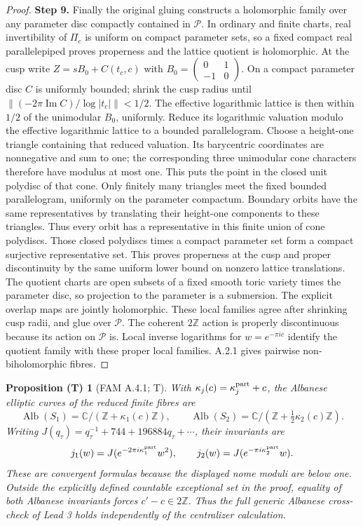 \documentclass[11pt,a4paper]{article}
\theoremstyle{plain}
\newtheorem{proposition}[theorem]{Proposition (T)}
\theoremstyle{definition}
\begin{document}
\begin{proof}
\par\smallskip\noindent\textbf{Step 9.} Finally the original gluing constructs a holomorphic family over any parameter disc compactly contained in $\mathcal P$. In ordinary and finite charts, real invertibility of $\Pi_c$ is uniform on compact parameter sets, so a fixed compact real parallelepiped proves properness and the lattice quotient is holomorphic. At the cusp write $Z=sB_0+C(t_c,c)$ with $B_0=\left(\begin{smallmatrix}0&1\\-1&0\end{smallmatrix}\right)$. On a compact parameter disc $C$ is uniformly bounded; shrink the cusp radius until
$\|(-2\pi\operatorname{Im}C)/\log|t_c|\|<1/2$. The effective logarithmic lattice is then within $1/2$ of the unimodular $B_0$, uniformly. Reduce its logarithmic valuation modulo the effective logarithmic lattice to a bounded parallelogram. Choose a height-one triangle containing that reduced valuation. Its barycentric coordinates are nonnegative and sum to one; the corresponding three unimodular cone characters therefore have modulus at most one. This puts the point in the closed unit polydisc of that cone. Only finitely many triangles meet the fixed bounded parallelogram, uniformly on the parameter compactum. Boundary orbits have the same representatives by translating their height-one components to these triangles. Thus every orbit has a representative in this finite union of cone polydiscs. Those closed polydiscs times a compact parameter set form a compact surjective representative set. This proves properness at the cusp and proper discontinuity by the same uniform lower bound on nonzero lattice translations. The quotient charts are open subsets of a fixed smooth toric variety times the parameter disc, so projection to the parameter is a submersion. The explicit overlap maps are jointly holomorphic. These local families agree after shrinking cusp radii, and glue over $\mathcal P$. The coherent $2\mathbb Z$ action is properly discontinuous because its action on $\mathcal P$ is. Local inverse logarithms for $w=e^{-\pi ic}$ identify the quotient family with these proper local families. A.2.1 gives pairwise non-biholomorphic fibres.
\end{proof}
\begin{proposition}[FAM A.4.1; T]\label{fam:A.4.1}
With $\kappa_j(c)=\kappa_j^{\rm part}+c$, the Albanese elliptic curves of the reduced finite fibres are
\[
 \operatorname{Alb}(S_1)=\mathbb C/(\mathbb Z+\kappa_1(c)\mathbb Z),\qquad
 \operatorname{Alb}(S_2)=\mathbb C/(\mathbb Z+\tfrac12\kappa_2(c)\mathbb Z).
\]
Writing $J(q_\tau)=q_\tau^{-1}+744+196884q_\tau+\cdots$, their invariants are
\[
 j_1(w)=J(e^{-2\pi i\kappa_1^{\rm part}}w^2),\qquad
 j_2(w)=J(e^{-\pi i\kappa_2^{\rm part}}w).
\]
These are convergent formulas because the displayed nome moduli are below one. Outside the explicitly defined countable exceptional set in the proof, equality of both Albanese invariants forces $c'-c\in2\mathbb Z$. Thus the full generic Albanese cross-check of Lead 3 holds independently of the centralizer calculation.
\end{proposition}
\end{document}

